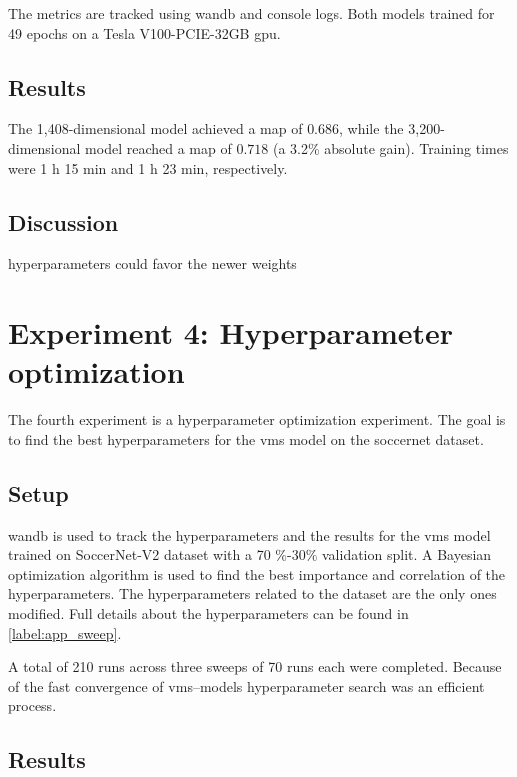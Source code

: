 The metrics are tracked using \acrlong{wandb} and console logs.
Both models trained for 49 epochs on a Tesla V100-PCIE-32GB \acrshort{gpu}.

\subsection{Results}
\label{ssec:ex3_results}
The 1,408-dimensional model achieved a  \acrshort{map} of \(0.686\), while the 3,200-dimensional model reached a \acrshort{map} of \(0.718\) (a 3.2\% absolute gain). Training times were 1 h 15 min and 1 h 23 min, respectively.


\subsection{Discussion}
\label{ssec:ex3_discussion}
hyperparameters could favor the newer weights


\section{Experiment 4: Hyperparameter optimization}
\label{sec:experiment4}

The fourth experiment is a hyperparameter optimization experiment.
The goal is to find the best hyperparameters for the \acrshort{vms} model on the soccernet dataset.

\subsection{Setup}
\label{ssec:ex4_setup}

\acrlong{wandb} is used to track the hyperparameters and the results for the \acrshort{vms} model trained on SoccerNet-V2 dataset with a 70 \(\%\)-30\(\%\) validation split. A Bayesian optimization algorithm is used to find the best importance and correlation of the hyperparameters. The hyperparameters related to the dataset are the only ones modified. Full details about the hyperparameters can be found in \autoref{label:app_sweep}.

A total of 210 runs across three sweeps of 70 runs each were completed. Because of the fast convergence of \acrshort{vms}--models hyperparameter search was an efficient process. 


\subsection{Results}
\label{ssec:ex4_results}

